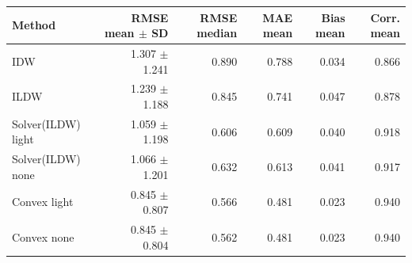 \begin{tabular}{lrrrrr}\toprule
Method & RMSE mean $\pm$ SD & RMSE median & MAE mean & Bias mean & Corr. mean \\ \midrule
IDW & 1.307 $\pm$ 1.241 & 0.890 & 0.788 & 0.034 & 0.866 \\
ILDW & 1.239 $\pm$ 1.188 & 0.845 & 0.741 & 0.047 & 0.878 \\
Solver(ILDW) light & 1.059 $\pm$ 1.198 & 0.606 & 0.609 & 0.040 & 0.918 \\
Solver(ILDW) none & 1.066 $\pm$ 1.201 & 0.632 & 0.613 & 0.041 & 0.917 \\
Convex light & 0.845 $\pm$ 0.807 & 0.566 & 0.481 & 0.023 & 0.940 \\
Convex none & 0.845 $\pm$ 0.804 & 0.562 & 0.481 & 0.023 & 0.940 \\
\bottomrule\end{tabular}

